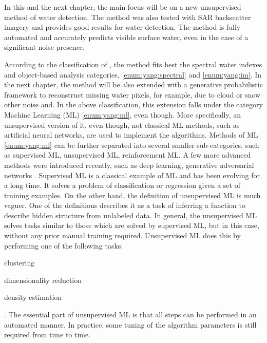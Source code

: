 In this and the next chapter, the main focus will be on a new unsupervised method of water detection. The method was also tested with SAR backscatter imagery and provides good results for water detection. The method is fully automated and accurately predicts visible surface water, even in the case of a significant noise presence. 

According to the classification of \citep{yang2015landsat}, the method fits best the spectral water indexes and object-based analysis categories, \ref{enum:yang:spectral} and \ref{enum:yang:im}. In the next chapter, the method will be also extended with a generative probabilistic framework to reconstruct missing water pixels, for example, due to cloud or snow other noise and. In the above classification, this extension falls under the category Machine Learning (ML) \ref{enum:yang:ml}, even though. More specifically, an unsupervised version of it, even though, not classical ML methods, such as artificial neural networks, are used to implement the algorithms. Methods of ML \ref{enum:yang:ml} can be further separated into several smaller sub-categories, such as supervised ML, unsupervised ML, reinforcement ML. A few more advanced methods were introduced recently, such as deep learning, generative adversarial networks \citep{goodfellow2014generative}. Supervised ML is a classical example of ML and has been evolving for a long time. It solves a problem of classification or regression given a set of training examples. On the other hand, the definition of unsupervised ML is much vaguer. One of the definitions describes it as a task of inferring a function to describe hidden structure from unlabeled data. In general, the unsupervised ML solves tasks similar to those which are solved by supervised ML, but in this case, without any prior manual training required. Unsupervised ML does this by performing one of the following tasks: 
\begin{enumerate*}[label=(\emph{\arabic*})]
	\item \label {enum:ml2:clustering} clustering
	\item \label {enum:ml2:dimentionality-reduction} dimensionality reduction
	\item \label {enum:ml2:density} density estimation
\end{enumerate*}.
The essential part of unsupervised ML is that all steps can be performed in an automated manner. In practice, some tuning of the algorithm parameters is still required from time to time.

